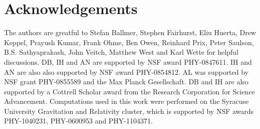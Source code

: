 \section*{Acknowledgements}

The authors are greatful to Stefan Ballmer, Stephen Fairhurst, Eliu Huerta, Drew Keppel, Prayush Kumar, Frank Ohme, Ben Owen,
Reinhard Prix, Peter
Saulson, B.S. Sathyaprakash, John Veitch, Matthew West and Karl Wette for helpful discussions. DB, IH and AN are
supported by NSF award PHY-0847611. IH and AN are also also supported by NSF
award PHY-0854812. AL was supported by NSF grant PHY-0855589 and the Max Planck Gesellschaft. DB and IH are also supported by a Cottrell Scholar award
from the Research Corporation for Science Advancement.  Computations used in
this work were performed on the Syracuse University Gravitation and Relativity
cluster, which is supported by NSF awards PHY-1040231, PHY-0600953 and
PHY-1104371.
